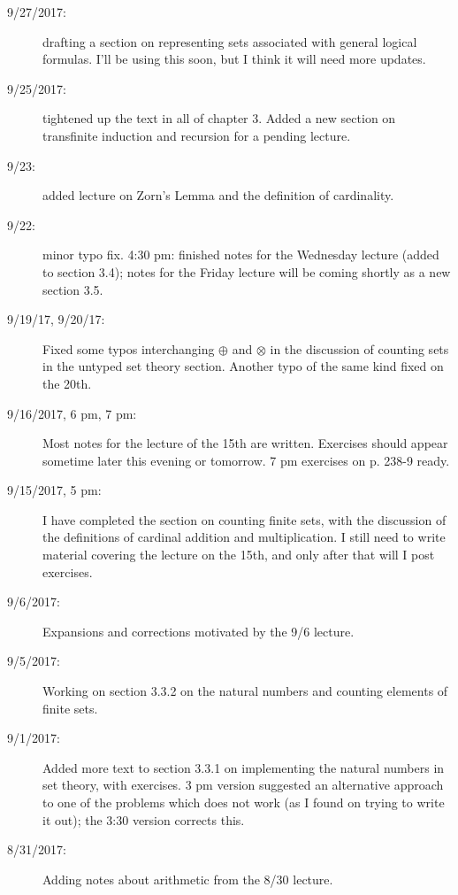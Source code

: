 \documentclass[12pt]{book}
\begin{document}
{\begin{description}
\item[9/27/2017:]  drafting a section on representing sets associated with general logical formulas.  I'll be using this soon, but I think it will need more updates.

\item[9/25/2017:]  tightened up the text in all of chapter 3.  Added a new section on transfinite induction and recursion for a pending lecture.

\item[9/23:]  added lecture on Zorn's Lemma and the definition of cardinality.

\item[9/22:]  minor typo fix.  4:30 pm:  finished notes for the Wednesday lecture (added to section 3.4); notes for the Friday lecture will be coming shortly as a new section 3.5.

\item[9/19/17, 9/20/17:]  Fixed some typos interchanging $\oplus$ and $\otimes$ in the discussion of counting sets in the untyped set theory section.  Another typo of the same kind fixed on the 20th.

\item[9/16/2017, 6 pm, 7 pm:]  Most notes for the lecture of the 15th are written.  Exercises should appear sometime later this evening or tomorrow.  7 pm exercises on p. 238-9 ready.

\item[9/15/2017, 5 pm:]  I have completed the section on counting finite sets, with the discussion of the definitions of cardinal addition and multiplication.  I still need to write material covering the lecture on the 15th, and only after that will I post exercises.

\item[9/6/2017:]  Expansions and corrections motivated by the 9/6 lecture.

\item[9/5/2017:]  Working on section 3.3.2 on the natural numbers and counting elements of finite sets.

\item[9/1/2017:]  Added more text to section 3.3.1 on implementing the natural numbers in set theory, with exercises.  3 pm version suggested an alternative approach to one of the problems which does not work (as I found on trying to write it out);  the 3:30 version corrects this.

\item[8/31/2017:]  Adding notes about arithmetic from the 8/30 lecture.


\end{description}}
\end{document}
